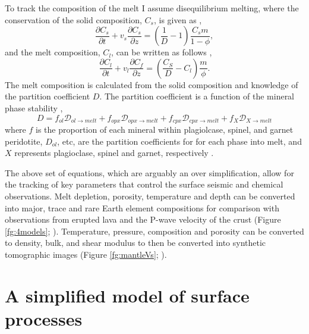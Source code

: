 \begin{subappendices}
To track the composition of the melt I assume disequilibrium melting, where the conservation of the solid composition, $C_{s}$, is given as \citep{spiegelman-1996},
\begin{equation}
\frac{\partial C_{s}}{\partial t} + v_{s}\frac{\partial C_{s}}{\partial z} = \left(\frac{1}{D} - 1\right) \frac{C_{s}m}{1-\phi},
\label{eq:solid-composition}
\end{equation}
and the melt composition, $C_{l}$, can be written as follows \citep{spiegelman-1996},
\begin{equation}
\frac{\partial C_{l}}{\partial t} + v_{l}\frac{\partial C_{f}}{\partial z} = \left(\frac{C_{S}}{D} - C_{l}\right)\frac{m}{\phi}.
\label{eq:melt-composition}
\end{equation}
The melt composition is calculated from the solid composition and knowledge of the partition coefficient $D$. The partition coefficient is a function of the mineral phase stability \citep{mckenzie-1991},
\begin{equation}
D = f_{ol}\mathcal{D}_{ol\rightarrow melt} + f_{opx}\mathcal{D}_{opx\rightarrow melt} + f_{cpx}\mathcal{D}_{cpx\rightarrow melt} + f_{X}\mathcal{D}_{X\rightarrow melt}
\label{eq:onions}
\end{equation}
where $f$ is the proportion of each mineral within plagiolcase, spinel, and garnet peridotite, $D_{ol}$, etc, are the partition coefficients for for each phase into melt, and $X$ represents plagioclase, spinel and garnet, respectively \citep[e.g.][]{armitage-etal-g3-2011,armitage-etal-g3-2018}.

The above set of equations, which are arguably an over simplification, allow for the tracking of key parameters that control the surface seismic and chemical observations. Melt depletion, porosity, temperature and depth can be converted into major, trace and rare Earth element compositions for comparison with observations from erupted lava and the P-wave velocity of the crust (Figure \ref{fg:4models}; \citealp{armitage-etal-2008,armitage-etal-2009,armitage-etal-2010,armitage-etal-g3-2011,armitage-etal-epsl-2015,armitage-etal-g3-2018,armitage-etal-grl-2019}). Temperature, pressure, composition and porosity can be converted to density, bulk, and shear modulus to then be converted into synthetic tomographic images (Figure \ref{fg:mantleVs}; \citealp{goes-etal-2012,armitage-etal-epsl-2015,armitage-etal-g3-2018,armitage-etal-grl-2019}).

\section{A simplified model of surface processes}\label{subsec:a-simplified-model-of-surface-processes}


\end{subappendices}
